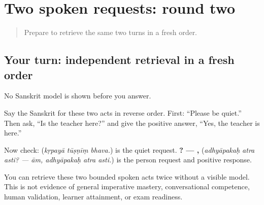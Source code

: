 \section[(independent spoken-request retrieval …]{Two spoken requests: round two}

\label{lesson:SA-C271-spoken-requests-final-retrieval}



\begin{quote}
Prepare to retrieve the same two turns in a fresh order.
\end{quote}

\subsection*{Your turn: independent retrieval in a fresh order}
No Sanskrit model is shown before you answer.

Say the Sanskrit for these two acts in reverse order. First: “Please be quiet.” Then ask, “Is the teacher here?” and give the positive answer, “Yes, the teacher is here.”

\begin{grammarlens}[title={What you've built: check after answering}]
Now check: \textbf{  } (\emph{kṛpayā tūṣṇīṃ bhava.}) is the quiet request. \textbf{  ? — ,   } (\emph{adhyāpakaḥ atra asti? — ām, adhyāpakaḥ atra asti.}) is the person request and positive response.
\end{grammarlens}

\begin{tcolorbox}[breakable,colback=teal!4,colframe=teal!35!black,title={Before you move on}]
You can retrieve these two bounded spoken acts twice without a visible model. This is not evidence of general imperative mastery, conversational competence, human validation, learner attainment, or exam readiness.
\end{tcolorbox}
